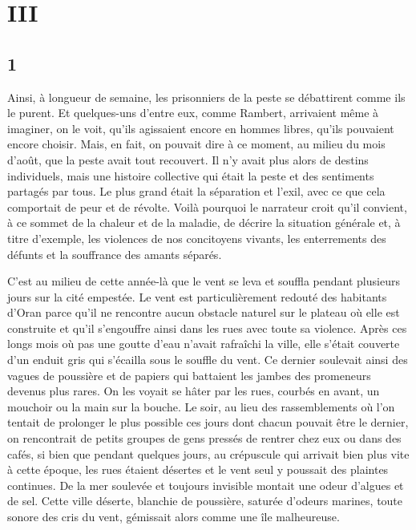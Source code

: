 \documentclass[french,twoside]{book} %
\newcommand\chapteropen{} %
\newcommand\chaptercont{} %
\begin{document}
\chapteropen
\chapter[{III}]{III}\renewcommand{\leftmark}{III}


\chaptercont
\section[{1}]{1}
\noindent Ainsi, à longueur de semaine, les prisonniers de la peste se débattirent comme ils le purent. Et quelques-uns d’entre eux, comme Rambert, arrivaient même à imaginer, on le voit, qu’ils agissaient encore en hommes libres, qu’ils pouvaient encore choisir. Mais, en fait, on pouvait dire à ce moment, au milieu du mois d’août, que la peste avait tout recouvert. Il n’y avait plus alors de destins individuels, mais une histoire collective qui était la peste et des sentiments partagés par tous. Le plus grand était la séparation et l’exil, avec ce que cela comportait de peur et de révolte. Voilà pourquoi le narrateur croit qu’il convient, à ce sommet de la chaleur et de la maladie, de décrire la situation générale et, à titre d’exemple, les violences de nos concitoyens vivants, les enterrements des défunts et la souffrance des amants séparés.\par
C’est au milieu de cette année-là que le vent se leva et souffla pendant plusieurs jours sur la cité empestée. Le vent est particulièrement redouté des habitants d’Oran parce qu’il ne rencontre aucun obstacle naturel sur le plateau où elle est construite et qu’il s’engouffre ainsi dans les rues avec toute sa violence. Après ces longs mois où pas une goutte d’eau n’avait rafraîchi la ville, elle s’était couverte d’un enduit gris qui s’écailla sous le souffle du vent. Ce dernier soulevait ainsi des vagues de poussière et de papiers qui battaient les jambes des promeneurs devenus plus rares. On les voyait se hâter par les rues, courbés en avant, un mouchoir ou la main sur la bouche. Le soir, au lieu des rassemblements où l’on tentait de prolonger le plus possible ces jours dont chacun pouvait être le dernier, on rencontrait de petits groupes de gens pressés de rentrer chez eux ou dans des cafés, si bien que pendant quelques jours, au crépuscule qui arrivait bien plus vite à cette époque, les rues étaient désertes et le vent seul y poussait des plaintes continues. De la mer soulevée et toujours invisible montait une odeur d’algues et de sel. Cette ville déserte, blanchie de poussière, saturée d’odeurs marines, toute sonore des cris du vent, gémissait alors comme une île malheureuse.\par
\end{document}
